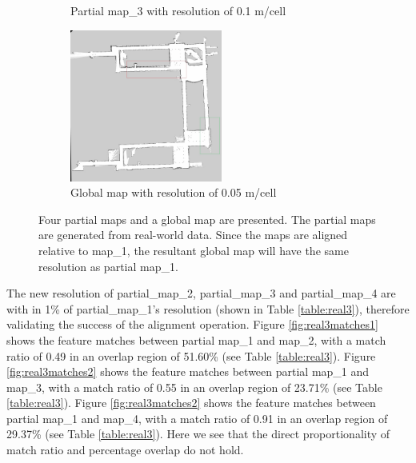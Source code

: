 \begin{figure}[H]
\begin{subfigure}{0.5\textwidth}
\caption{Partial map\_3 with resolution of 0.1 m/cell}
\label{fig:real34}
\end{subfigure}
\begin{subfigure}{0.5\textwidth}
\centering
\includegraphics[width=0.9\linewidth, height=5cm]{figs/real_world_results/a/final_map_marked.jpg} 
\caption{Global map with resolution of 0.05 m/cell}
\label{fig:real35}
\end{subfigure}
\caption{Four partial maps and a global map are presented. The partial maps are generated from real-world data. Since the maps are aligned relative to map\_1, the resultant global map will have the same resolution as partial map\_1.}
\label{fig:real3}
\end{figure}

The new resolution of partial\_map\_2, partial\_map\_3 and partial\_map\_4 are with in 1\% of partial\_map\_1's resolution (shown in Table \ref{table:real3}), therefore validating the success of the alignment operation. Figure \ref{fig:real3matches1} shows the feature matches between partial map\_1 and map\_2, with a match ratio of 0.49 in an overlap region of 51.60\% (see Table \ref{table:real3}). Figure \ref{fig:real3matches2} shows the feature matches between partial map\_1 and map\_3, with a match ratio of 0.55 in an overlap region of 23.71\% (see Table \ref{table:real3}). Figure \ref{fig:real3matches2} shows the feature matches between partial map\_1 and map\_4, with a match ratio of 0.91 in an overlap region of 29.37\% (see Table \ref{table:real3}). Here we see that the direct proportionality of match ratio and percentage overlap do not hold.

